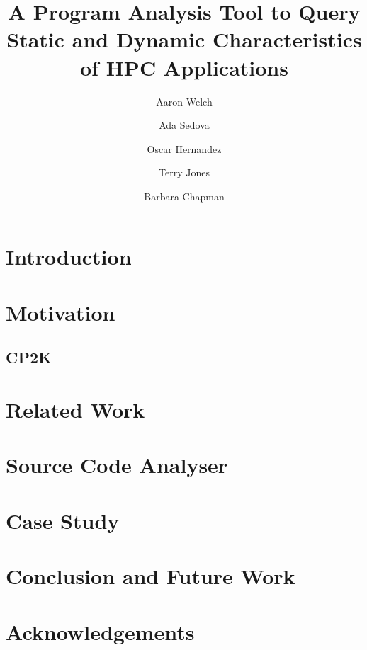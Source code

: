 \documentclass[runningheads]{llncs}
\begin{document}
\title{\LARGE \bf
A Program Analysis Tool to Query Static and Dynamic Characteristics of HPC Applications
}
\author[1, 2]{Aaron Welch}
\author[1]{Ada Sedova}
\author[1]{Oscar Hernandez}
\author[1]{Terry Jones}
\author[2]{Barbara Chapman}

\maketitle
\begin{abstract}

\end{abstract}
\section{Introduction}
\label{sec:intro}

\section{Motivation}
\label{sec:motivation}

\subsection{CP2K}
\label{sec:cp2k}

\section{Related Work}
\label{sec:related}

\section{Source Code Analyser}
\label{sec:analysis}

\section{Case Study}
\label{sec:casestudy}

\section{Conclusion and Future Work}
\label{sec:conclusion}

\section*{Acknowledgements}
\label{sec:ack}



\end{document}
